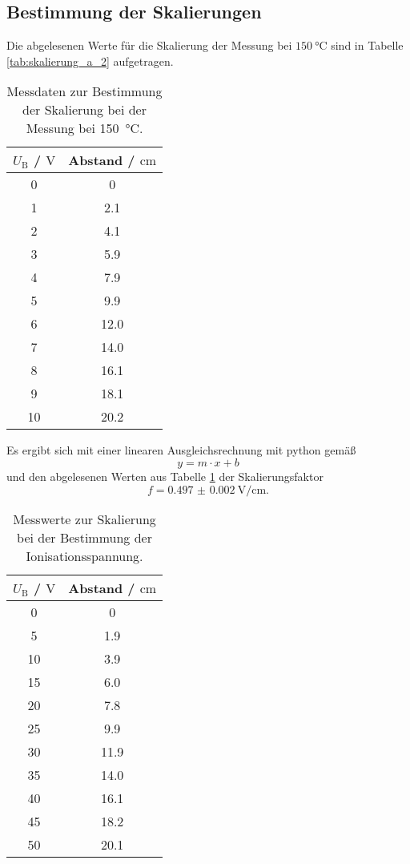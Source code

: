 \subsection{Bestimmung der Skalierungen}
Die abgelesenen Werte für die Skalierung der Messung bei $\SI{150}{\celsius}$ sind in
Tabelle \ref{tab:skalierung_a_2} aufgetragen.
\begin{table}
	\centering
	\caption{Messdaten zur Bestimmung der Skalierung bei der Messung bei \SI{150}{\celsius}.}
	\label{tab:a_2}
	\begin{tabular}{cc}
		\toprule
		$U_{\mathrm{B}}$ / $\si{\volt}$ & Abstand / $\si{\centi\meter}$ \\
		\midrule
		0 & 0 \\
		1 & 2.1 \\
		2 & 4.1 \\
		3 & 5.9 \\
		4 & 7.9 \\
		5 & 9.9 \\
		6 & 12.0 \\
		7 & 14.0 \\
		8 & 16.1 \\
		9 & 18.1 \\
		10 & 20.2 \\
		\bottomrule
	\end{tabular}
\end{table}
Es ergibt sich mit einer linearen Ausgleichsrechnung mit python \cite{python} gemäß
\begin{equation*}
	y = m \cdot x + b
\end{equation*}
 und den abgelesenen Werten aus Tabelle \ref{tab:a_2} der Skalierungsfaktor 
\begin{equation*}
	f = \SI{0.497(2)}{\volt\per\centi\meter} \mathrm{.}
\end{equation*}
\begin{table}
	\centering
	\caption{Messwerte zur Skalierung bei der Bestimmung der Ionisationsspannung.}
	\label{tab:c}
	\begin{tabular}{cc}
		\toprule
		$U_{\mathrm{B}}$ / $\si{\volt}$ & Abstand / $\si{\centi\meter}$ \\
		\midrule
		0 & 0 \\
		5 & 1.9 \\
		10 & 3.9 \\
		15 & 6.0 \\
		20 & 7.8 \\
		25 & 9.9 \\
		30 & 11.9 \\
		35 & 14.0 \\
		40 & 16.1 \\
		45 & 18.2 \\
		50 & 20.1 \\
		\bottomrule
	\end{tabular}
\end{table}
